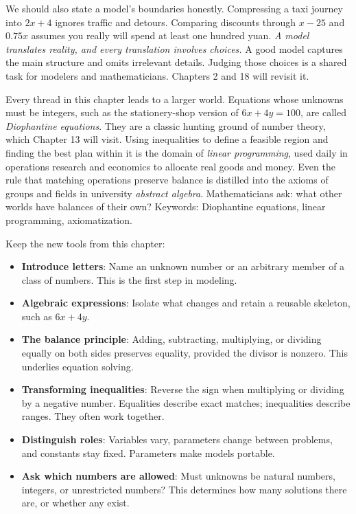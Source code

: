 We should also state a model's boundaries honestly. Compressing a taxi journey into $2x+4$ ignores traffic and detours. Comparing discounts through $x-25$ and $0.75x$ assumes you really will spend at least one hundred yuan. \emph{A model translates reality, and every translation involves choices.} A good model captures the main structure and omits irrelevant details. Judging those choices is a shared task for modelers and mathematicians. Chapters 2 and 18 will revisit it.

\begin{pandeng}
Every thread in this chapter leads to a larger world. Equations whose unknowns must be integers, such as the stationery-shop version of $6x+4y=100$, are called \emph{Diophantine equations}. They are a classic hunting ground of number theory, which Chapter 13 will visit. Using inequalities to define a feasible region and finding the best plan within it is the domain of \emph{linear programming}, used daily in operations research and economics to allocate real goods and money. Even the rule that matching operations preserve balance is distilled into the axioms of groups and fields in university \emph{abstract algebra}. Mathematicians ask: what other worlds have balances of their own? Keywords: Diophantine equations, linear programming, axiomatization.
\end{pandeng}

\begin{toolbox}
Keep the new tools from this chapter:
\begin{itemize}
\item \textbf{Introduce letters}: Name an unknown number or an arbitrary member of a class of numbers. This is the first step in modeling.
\item \textbf{Algebraic expressions}: Isolate what changes and retain a reusable skeleton, such as $6x+4y$.
\item \textbf{The balance principle}: Adding, subtracting, multiplying, or dividing equally on both sides preserves equality, provided the divisor is nonzero. This underlies equation solving.
\item \textbf{Transforming inequalities}: Reverse the sign when multiplying or dividing by a negative number. Equalities describe exact matches; inequalities describe ranges. They often work together.
\item \textbf{Distinguish roles}: Variables vary, parameters change between problems, and constants stay fixed. Parameters make models portable.
\item \textbf{Ask which numbers are allowed}: Must unknowns be natural numbers, integers, or unrestricted numbers? This determines how many solutions there are, or whether any exist.
\end{itemize}
\end{toolbox}

